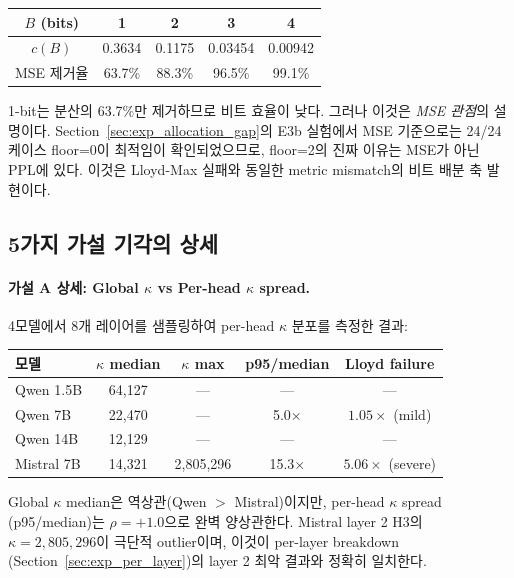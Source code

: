 \begin{center}
\begin{tabular}{@{}ccccc@{}}
\toprule
$B$ (bits) & 1 & 2 & 3 & 4 \\
\midrule
$c(B)$ & 0.3634 & 0.1175 & 0.03454 & 0.00942 \\
MSE 제거율 & 63.7\% & 88.3\% & 96.5\% & 99.1\% \\
\bottomrule
\end{tabular}
\end{center}

1-bit는 분산의 63.7\%만 제거하므로 비트 효율이 낮다. 그러나 이것은 \emph{MSE 관점}의 설명이다. Section~\ref{sec:exp_allocation_gap}의 E3b 실험에서 MSE 기준으로는 24/24 케이스 floor=0이 최적임이 확인되었으므로, floor=2의 진짜 이유는 MSE가 아닌 PPL에 있다. 이것은 Lloyd-Max 실패와 동일한 metric mismatch의 비트 배분 축 발현이다.

\subsection{5가지 가설 기각의 상세}
\label{sec:appendix_five_rejections}

\paragraph{가설 A 상세: Global $\kappa$ vs Per-head $\kappa$ spread.}
4모델에서 8개 레이어를 샘플링하여 per-head $\kappa$ 분포를 측정한 결과:

\begin{center}
\small
\begin{tabular}{@{}lcccc@{}}
\toprule
모델 & $\kappa$ median & $\kappa$ max & p95/median & Lloyd failure \\
\midrule
Qwen 1.5B & 64,127 & --- & --- & --- \\
Qwen 7B & 22,470 & --- & 5.0$\times$ & $1.05\times$ (mild) \\
Qwen 14B & 12,129 & --- & --- & --- \\
Mistral 7B & 14,321 & 2,805,296 & 15.3$\times$ & $5.06\times$ (severe) \\
\bottomrule
\end{tabular}
\end{center}

Global $\kappa$ median은 역상관(Qwen $>$ Mistral)이지만, per-head $\kappa$ spread (p95/median)는 $\rho = +1.0$으로 완벽 양상관한다. Mistral layer 2 H3의 $\kappa = 2,805,296$이 극단적 outlier이며, 이것이 per-layer breakdown (Section~\ref{sec:exp_per_layer})의 layer 2 최악 결과와 정확히 일치한다.

